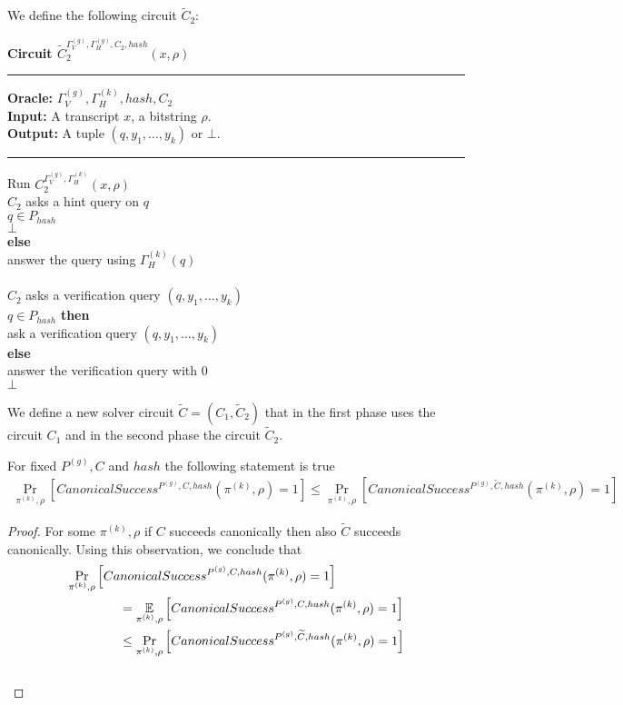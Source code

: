%
\newcommand{\prGx}{(\Gamma_V,\Gamma_H) := \langle P^{(1)}(\pi^*), D_1(\rho) \rangle_{P^{(1)}} \\ x^* := \langle P^{(1)}(\pi^*), D_1(\rho) \rangle_{\text{trans}}}
%
We define the following circuit $\widetilde{C}_2$:
\begin{codeblock}
  \textbf{Circuit $\widetilde{C}_2^{\Gamma_V^{(g)}, \Gamma_H^{(g)}, C_2, hash} (x, \rho)$}
  \medskip \hrule \medskip
  \textbf{Oracle:} $\Gamma_V^{(g)}, \Gamma_H^{(k)}, hash, C_2$ \\
  \textbf{Input:} A transcript $x$, a bitstring $\rho$. \\
  \textbf{Output:} A tuple $(q, y_1, \dots, y_k)$ or $\bot$.
  \medskip\hrule\medskip
  Run $C_2^{\Gamma_V^{(g)},\Gamma_H^{(k)}}(x, \rho)$ \\
  \IndI \If $C_2$ asks a hint query on $q$ \then\\
  \IndII \If $q \in P_{hash}$ \then\\
  \IndIII \return $\bot$\\
  \IndII \textbf{else}\\
  \IndIII answer the query using $\Gamma_H^{(k)}(q)$\\
  \\
  \IndI \If $C_2$ asks a verification query $(q, y_1, \dots, y_k)$ \then \\
  \IndII \If $q \in P_{hash}$ \textbf{then} \\
  \IndIII ask a verification query $(q, y_1, \dots, y_k)$ \\
  \IndII \textbf{else} \\
  \IndIII answer the verification query with 0 \\
  \return $\bot$
\end{codeblock}
%
We define a new solver circuit $\widetilde{C} = (C_1, \widetilde{C}_2)$
that in the first phase uses the circuit $C_1$ and in the second phase the circuit $\widetilde{C}_2$.
%
\begin{lemma}
  \label{lemma:ctilda_c}
  For fixed $P^{(g)}, C$ and $hash$ the following statement is true
  \begin{align*}
    \underset{\pi^{(k)}, \rho}{\Pr}[CanonicalSuccess^{P^{(g)}, C, hash}(\pi^{(k)}, \rho) = 1]
    \leq \underset{\pi^{(k)}, \rho}{\Pr}[CanonicalSuccess^{P^{(g)}, \widetilde{C}, hash}(\pi^{(k)}, \rho) = 1]
  \end{align*}
\end{lemma}
%
\begin{proof}
For some $\pi^{(k)}, \rho$ if $C$ succeeds canonically then also $\widetilde{C}$ succeeds canonically.
Using this observation, we conclude that
\begin{align*}
  &\underset{\pi^{(k)}, \rho}{\Pr}\left[CanonicalSuccess^{P^{(g)}, C, hash}(\pi^{(k)}, \rho) = 1\right] \\
  &\mbox\qquad\qquad = \underset{\pi^{(k)}, \rho}{\mathbb{E}}\left[CanonicalSuccess^{P^{(g)}, C, hash}(\pi^{(k)}, \rho) = 1 \right] \\
  &\mbox\qquad\qquad \leq \underset{\pi^{(k)}, \rho}{\Pr}\left[CanonicalSuccess^{P^{(g)}, \widetilde{C}, hash}(\pi^{(k)}, \rho) = 1\right]
\end{align*}
\\\text{  }
\end{proof}
